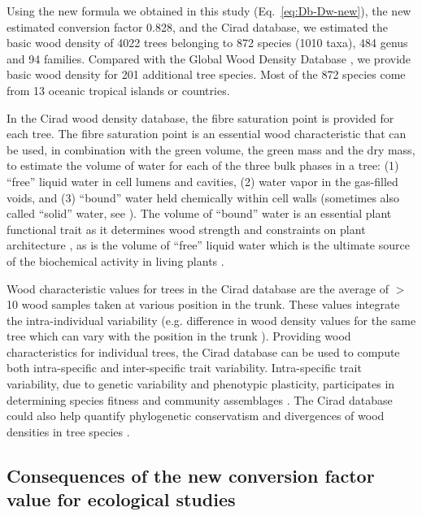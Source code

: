 \documentclass[a4paper, 12pt, leqno, dvipsnames]{article}\usepackage[]{graphicx}\usepackage[]{color}
\begin{document}
Using the new formula we obtained in this study (Eq.~\ref{eq:Db-Dw-new}), the new estimated conversion factor 0.828, and the Cirad database, we estimated the basic wood density of 4022 trees belonging to 872 species (1010 taxa), 484 genus and 94 families. Compared with the Global Wood Density Database \citep{Zanne2009}, we provide basic wood density for 201 additional tree species. Most of the 872 species come from 13 oceanic tropical islands or countries.

In the Cirad wood density database, the fibre saturation point is provided for each tree. The fibre saturation point is an essential wood characteristic that can be used, in combination with the green volume, the green mass and the dry mass, to estimate the volume of water for each of the three bulk phases in a tree: (1) ``free'' liquid water in cell lumens and cavities, (2) water vapor in the gas-filled voids, and (3) ``bound'' water held chemically within cell walls (sometimes also called ``solid'' water, see \citet{Berry2005}). The volume of ``bound'' water is an essential plant functional trait as it determines wood strength and constraints on plant architecture \citep{Niklas1993}, as is the volume of ``free'' liquid water which is the ultimate source of the biochemical activity in living plants \citep{Berry2005}.

Wood characteristic values for trees in the Cirad database are the average of $>$10 wood samples taken at various position in the trunk. These values integrate the intra-individual variability (e.g. difference in wood density values for the same tree which can vary with the position in the trunk \citep{Bastin2015}). Providing wood characteristics for individual trees, the Cirad database can be used to compute both intra-specific and inter-specific trait variability. Intra-specific trait variability, due to genetic variability and phenotypic plasticity, participates in determining species fitness and community assemblages \citep{Courbaud2012, Albert2011, Roughgarden1979}. The Cirad database could also help quantify phylogenetic conservatism and divergences of wood densities in tree species \citep{Flores2011}.

\subsection{Consequences of the new conversion factor value for ecological studies}
\end{document}

